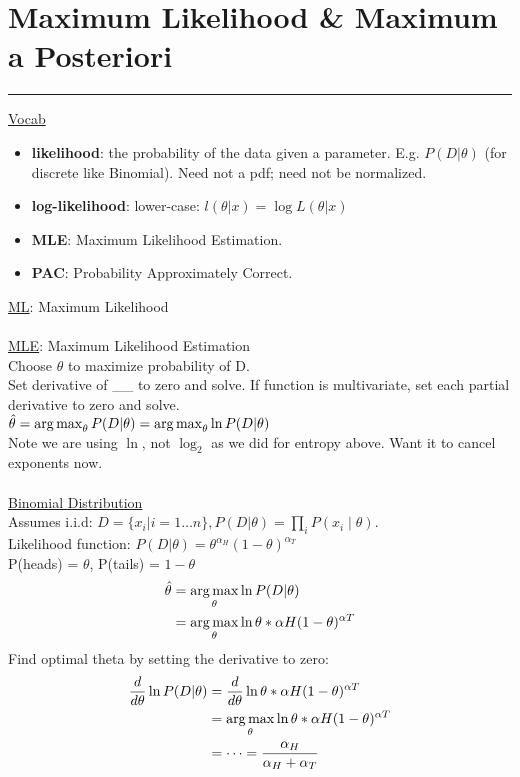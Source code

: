 \section{Maximum Likelihood \& Maximum a Posteriori}
\smallskip \hrule height 2pt \smallskip

\underline{Vocab}
\begin{itemize}
	\item\textbf{likelihood}: the probability of the data given a parameter.  E.g. $P(D | \theta)$ (for discrete like Binomial).  
	Need not a pdf; need not be normalized.   %
 	\item \textbf{log-likelihood}: lower-case: $l(\theta|x) = \log L(\theta | x)$
	\item \textbf{MLE}: Maximum Likelihood Estimation. 
	\item \textbf{PAC}: Probability Approximately Correct. 
\end{itemize}

\underline{ML}: Maximum Likelihood \hfill \\
 \hfill \\
 
\underline{MLE}: Maximum Likelihood Estimation \hfill \\
Choose $\theta$ to maximize probability of D. \hfill \\
Set derivative of \_\_ to zero and solve.  If function is multivariate, set each partial derivative to zero and solve. \hfill \\
$\hat{\theta} = \operatorname*{arg\,max}_\theta P(D | \theta) = \operatorname*{arg\,max}_\theta \ln P(D | \theta) $ \hfill \\
Note we are using $\ln$, not $\log_2$ as we did for entropy above.  Want it to cancel exponents now. 
 \hfill \\
 
\hfill \\
\underline{Binomial Distribution} \hfill \\
Assumes i.i.d: $D=\{x_i | i=1 \dots n\}, P(D | \theta) = \prod_i P(x_i \mid \theta)$. \hfill \\
Likelihood function: $P(D | \theta) = \theta^{\alpha_H} (1-\theta)^{\alpha_T}$  \hfill \\
P(heads) = $\theta$, P(tails) = $1 - \theta$ \hfill \\
\begin{align*} 
	\hat{\theta} &= \operatorname*{arg\,max}_\theta \ln P(D| \theta) \\
	 	 &= \operatorname*{arg\,max}_\theta \ln \theta*{\alpha H}(1-\theta)^{\alpha T}
\end{align*}
Find optimal theta by setting the derivative to zero: 
\begin{align*} 
	\frac{d}{d\theta} \ln P(D| \theta) &= \frac{d}{d\theta}  \ln \theta*{\alpha H}(1-\theta)^{\alpha T} \\
	 	 &= \operatorname*{arg\,max}_\theta \ln \theta*{\alpha H}(1-\theta)^{\alpha T} \\
		 & = \dots = \frac{\alpha_H}{\alpha_H  + \alpha_T}
\end{align*}

